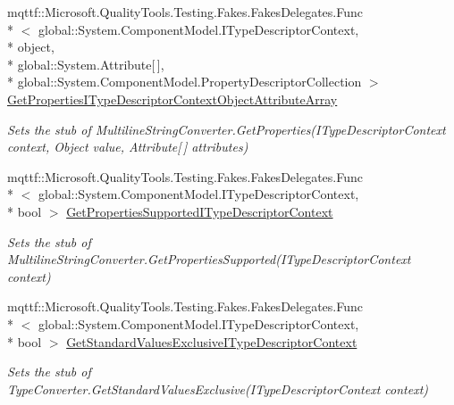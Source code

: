\begin{DoxyCompactItemize}
mqttf\-::\-Microsoft.\-Quality\-Tools.\-Testing.\-Fakes.\-Fakes\-Delegates.\-Func\\*
$<$ global\-::\-System.\-Component\-Model.\-I\-Type\-Descriptor\-Context, \\*
object, \\*
global\-::\-System.\-Attribute\mbox{[}$\,$\mbox{]}, \\*
global\-::\-System.\-Component\-Model.\-Property\-Descriptor\-Collection $>$ \hyperlink{class_system_1_1_component_model_1_1_fakes_1_1_stub_multiline_string_converter_aa8655d2443a3d2f397f20c989398387f}{Get\-Properties\-I\-Type\-Descriptor\-Context\-Object\-Attribute\-Array}
\begin{DoxyCompactList}\small\item\em Sets the stub of Multiline\-String\-Converter.\-Get\-Properties(\-I\-Type\-Descriptor\-Context context, Object value, Attribute\mbox{[}$\,$\mbox{]} attributes)\end{DoxyCompactList}\item 
mqttf\-::\-Microsoft.\-Quality\-Tools.\-Testing.\-Fakes.\-Fakes\-Delegates.\-Func\\*
$<$ global\-::\-System.\-Component\-Model.\-I\-Type\-Descriptor\-Context, \\*
bool $>$ \hyperlink{class_system_1_1_component_model_1_1_fakes_1_1_stub_multiline_string_converter_a3c0a9ce48cad2a768a1b351c53107d9c}{Get\-Properties\-Supported\-I\-Type\-Descriptor\-Context}
\begin{DoxyCompactList}\small\item\em Sets the stub of Multiline\-String\-Converter.\-Get\-Properties\-Supported(\-I\-Type\-Descriptor\-Context context)\end{DoxyCompactList}\item 
mqttf\-::\-Microsoft.\-Quality\-Tools.\-Testing.\-Fakes.\-Fakes\-Delegates.\-Func\\*
$<$ global\-::\-System.\-Component\-Model.\-I\-Type\-Descriptor\-Context, \\*
bool $>$ \hyperlink{class_system_1_1_component_model_1_1_fakes_1_1_stub_multiline_string_converter_a4001c33f608de40abef0ad022f4c81c7}{Get\-Standard\-Values\-Exclusive\-I\-Type\-Descriptor\-Context}
\begin{DoxyCompactList}\small\item\em Sets the stub of Type\-Converter.\-Get\-Standard\-Values\-Exclusive(\-I\-Type\-Descriptor\-Context context)\end{DoxyCompactList}\item 

\end{DoxyCompactItemize}
